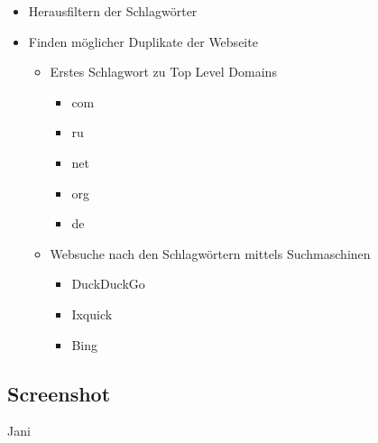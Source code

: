 \begin{itemize}
  \item Herausfiltern der Schlagwörter
  \item Finden möglicher Duplikate der Webseite
  \begin{itemize}
    \item Erstes Schlagwort zu Top Level Domains
    \begin{itemize}
      \item com
      \item ru
      \item net
      \item org
      \item de
    \end{itemize}
    \item Websuche nach den Schlagwörtern mittels Suchmaschinen
    \begin{itemize}
      \item DuckDuckGo
      \item Ixquick
      \item Bing
    \end{itemize}
  \end{itemize}
\end{itemize}

\subsection{Screenshot}

\todo Jani

